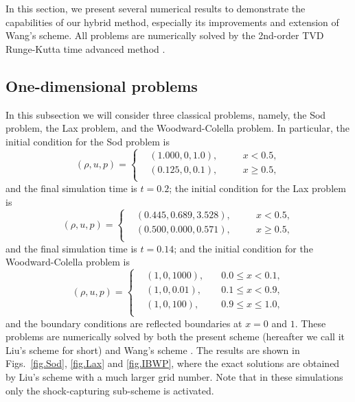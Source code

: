 \documentclass[review]{elsarticle}
\begin{document}
In this section, we present several numerical results to demonstrate the capabilities of our hybrid method, especially its improvements and extension of Wang's scheme. All problems are numerically solved by the 2nd-order TVD Runge-Kutta time advanced method \citep{Shu1988}.


\subsection{One-dimensional problems}\label{sec.4.1}

In this subsection we will consider three classical problems, namely, the Sod problem, the Lax problem, and the Woodward-Colella problem. In particular, the initial condition for the Sod problem is \citep{Sod1978}
\begin{equation}\label{eq.Sod}
  (\rho, u, p) = \left\{
  \begin{split}
  &(1.000, 0, 1.0), & \quad & x < 0.5, \\
  &(0.125, 0, 0.1), & \quad & x \ge 0.5, \\
  \end{split}
  \right.
\end{equation}
and the final simulation time is $t=0.2$; the initial condition for the Lax problem is \citep{Lax1954}
\begin{equation}\label{eq.Lax}
  (\rho, u, p) = \left\{
  \begin{split}
  &(0.445, 0.689, 3.528), & \quad & x < 0.5, \\
  &(0.500, 0.000, 0.571), & \quad & x \ge 0.5, \\
  \end{split}
  \right.
\end{equation}
and the final simulation time is $t=0.14$; and the initial condition for the Woodward-Colella problem is \citep{Woodward1984}
\begin{equation}\label{IBWP}
  (\rho, u, p) = \left\{
  \begin{split}
  &(1, 0, 1000), & \quad 0.0 \le x < 0.1, \\
  &(1, 0, 0.01), & \quad 0.1 \le x < 0.9, \\
  &(1, 0, 100), & \quad 0.9 \le x \le 1.0, \\
  \end{split}
  \right.
\end{equation}
and the boundary conditions are reflected boundaries at $x=0$ and $1$. These problems are numerically solved by both the present scheme (hereafter we call it Liu's scheme for short) and Wang's scheme \citep{Wang2010}. The results are shown in Figs.~\ref{fig.Sod}, \ref{fig.Lax}  and \ref{fig.IBWP}, where the exact solutions are obtained by Liu's scheme with a much larger grid number. Note that in these simulations only the shock-capturing sub-scheme is activated.
\end{document}
